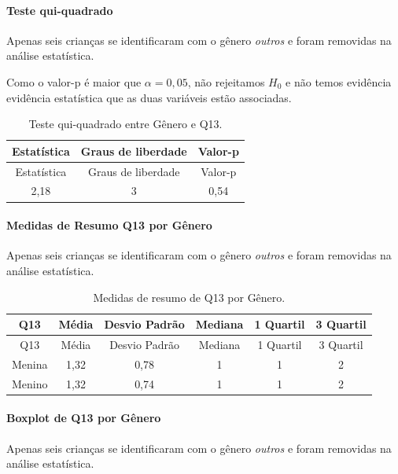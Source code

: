 \documentclass[]{article}
\let\oldparagraph\paragraph
\renewcommand{\paragraph}[1]{\oldparagraph{#1}\mbox{}}
\begin{document}
\hypertarget{teste-qui-quadrado-8}{%
\paragraph{Teste qui-quadrado}\label{teste-qui-quadrado-8}}

Apenas seis crianças se identificaram com o gênero \emph{outros} e foram removidas na análise estatística.

Como o valor-p é maior que \(\alpha=0,05\), não rejeitamos \(H_0\) e não temos evidência evidência estatística que as duas variáveis estão associadas.

\begin{longtable}[]{@{}ccc@{}}
\caption{\label{tab:unnamed-chunk-64}Teste qui-quadrado entre Gênero e Q13.}\tabularnewline
\toprule
Estatística & Graus de liberdade & Valor-p\tabularnewline
\midrule
\endfirsthead
\toprule
Estatística & Graus de liberdade & Valor-p\tabularnewline
\midrule
\endhead
2,18 & 3 & 0,54\tabularnewline
\bottomrule
\end{longtable}

\cleardoublepage

\hypertarget{medidas-de-resumo-q13-por-guxeanero}{%
\paragraph{Medidas de Resumo Q13 por Gênero}\label{medidas-de-resumo-q13-por-guxeanero}}

Apenas seis crianças se identificaram com o gênero \emph{outros} e foram removidas na análise estatística.

\begin{longtable}[]{@{}cccccc@{}}
\caption{\label{tab:unnamed-chunk-65}Medidas de resumo de Q13 por Gênero.}\tabularnewline
\toprule
Q13 & Média & Desvio Padrão & Mediana & 1 Quartil & 3 Quartil\tabularnewline
\midrule
\endfirsthead
\toprule
Q13 & Média & Desvio Padrão & Mediana & 1 Quartil & 3 Quartil\tabularnewline
\midrule
\endhead
Menina & 1,32 & 0,78 & 1 & 1 & 2\tabularnewline
Menino & 1,32 & 0,74 & 1 & 1 & 2\tabularnewline
\bottomrule
\end{longtable}

\hypertarget{boxplot-de-q13-por-guxeanero}{%
\paragraph{Boxplot de Q13 por Gênero}\label{boxplot-de-q13-por-guxeanero}}

Apenas seis crianças se identificaram com o gênero \emph{outros} e foram removidas na análise estatística.
\end{document}
